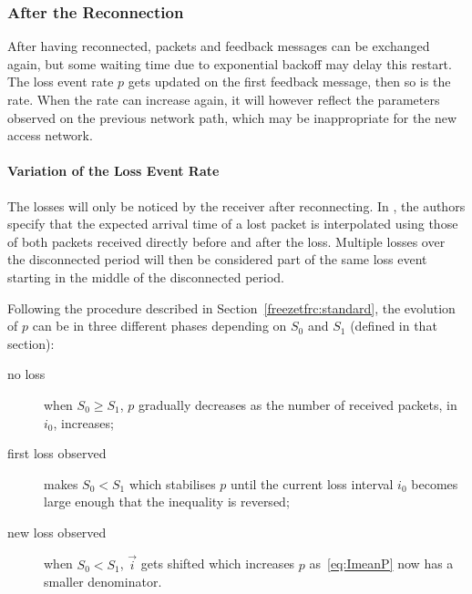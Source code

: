 \documentclass[twocolumn]{nictatechreport}
\begin{document}
\subsubsection{After the Reconnection}
\label{sec:after-reco}

After having reconnected, packets and feedback messages can be exchanged again,
but some waiting time due to exponential backoff may delay this restart.  The
loss event rate $p$ gets updated on the first feedback message, then so is the
rate. When the rate can increase again, it will however reflect the parameters
observed on the previous network path, which may be inappropriate for the new
access network.

\paragraph{Variation of the Loss Event Rate}

The losses will only be noticed by the receiver after reconnecting.  In
\cite{rfc5348}, the authors specify that the expected arrival time of a lost
packet is interpolated using those of both packets received directly before and
after the loss. Multiple losses over the disconnected period will then be
considered part of the same loss event starting in the middle of the
disconnected period.

Following the procedure described in Section~\ref{freezetfrc:standard}, the
evolution of $p$ can be in three different phases depending on $S_0$ and $S_1$
(defined in that section):
\begin{description}
  \item[no loss] when $S_0\ge S_1$, $p$ gradually decreases as the number of
    received packets, in $i_0$, increases;
  \item[first loss observed] makes $S_0<S_1$ which stabilises $p$ until the current loss
    interval $i_0$ becomes large enough that the inequality is reversed;
  \item[new loss observed] when $S_0<S_1$, $\vec i$ gets shifted which increases
    $p$ as~\eqref{eq:ImeanP} now has a smaller denominator.
\end{description}
\end{document}
